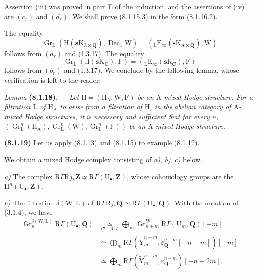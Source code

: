 \documentclass[11pt,leqno]{article}
\begin{document}
Assertion (iii) was proved in part E of the induction, and the assertions of (iv) are \((c_{r})\) and \((d_{r})\). We shall prove (8.1.15.3) in the form (8.1.16.2).

The equality
\[
\operatorname{Gr}_{\mathrm{L}}
(\mathrm{H}(\mathbf{s}\mathrm{K}_{\mathrm{A}\otimes\mathbf{Q}}),
\operatorname{Dec}_{1}\mathrm{W})
=
({}_{\mathrm{L}}\mathrm{E}_{\infty}
(\mathbf{s}\mathrm{K}_{\mathrm{A}\otimes\mathbf{Q}}),\mathrm{W})
\]
follows from \((a_{r})\) and (1.3.17). The equality
\[
\operatorname{Gr}_{\mathrm{L}}
(\mathrm{H}(\mathbf{s}\mathrm{K}_{\mathbf{C}}),\mathrm{F})
=
({}_{\mathrm{L}}\mathrm{E}_{\infty}
(\mathbf{s}\mathrm{K}_{\mathbf{C}}),\mathrm{F})
\]
follows from \((b_{r})\) and (1.3.17). We conclude by the following lemma, whose verification is left to the reader:

\textit{Lemma} \textbf{(8.1.18)}. — \textit{Let \(\mathrm{H}=(\mathrm{H}_{\mathrm{A}},\mathrm{W},\mathrm{F})\) be an \(\mathrm{A}\)-mixed Hodge structure. For a filtration \(\mathrm{L}\) of \(\mathrm{H}_{\mathrm{A}}\) to arise from a filtration of \(\mathrm{H}\), in the abelian category of \(\mathrm{A}\)-mixed Hodge structures, it is necessary and sufficient that for every \(n\), \((\operatorname{Gr}_{\mathrm{L}}^{n}(\mathrm{H}_{\mathrm{A}}),\operatorname{Gr}_{\mathrm{L}}^{n}(\mathrm{W}),\operatorname{Gr}_{\mathrm{L}}^{n}(\mathrm{F}))\) be an \(\mathrm{A}\)-mixed Hodge structure.}

\textbf{(8.1.19)} Let us apply (8.1.13) and (8.1.15) to example (8.1.12).

We obtain a mixed Hodge complex consisting of \textit{a)}, \textit{b)}, \textit{c)} below.

\textit{a)} The complex \(\mathrm{R}\Gamma\mathrm{R}j_{\ast}\mathbf{Z}\simeq\mathrm{R}\Gamma(\mathrm{U}_{\bullet},\mathbf{Z})\), whose cohomology groups are the \(\mathrm{H}^{n}(\mathrm{U}_{\bullet},\mathbf{Z})\).

\textit{b)} The filtration \(\delta(\mathrm{W},\mathrm{L})\) of \(\mathrm{R}\Gamma\mathrm{R}j_{\ast}\mathbf{Q}\simeq\mathrm{R}\Gamma(\mathrm{U}_{\bullet},\mathbf{Q})\). With the notation of (3.1.4), we have
\begin{align*}
\operatorname{Gr}_{n}^{\delta(\mathrm{W},\mathrm{L})}
\mathrm{R}\Gamma(\mathrm{U}_{\bullet},\mathbf{Q})
&\underset{\text{(7.1.6.5)}}{\simeq}
\bigoplus_m
\operatorname{Gr}_{n+m}^{\mathrm{W}}
\mathrm{R}\Gamma(\mathrm{U}_{m},\mathbf{Q})[-m]
\\
&\simeq
\bigoplus_m
\mathrm{R}\Gamma
(\widetilde{\mathrm{Y}}_{m}^{n+m},
\varepsilon_{\mathbf{Q}}^{n+m}[-n-m])[-m]
\\
&\simeq
\bigoplus_m
\mathrm{R}\Gamma
(\widetilde{\mathrm{Y}}_{m}^{n+m},
\varepsilon_{\mathbf{Q}}^{n+m})[-n-2m].
\end{align*}
\end{document}
